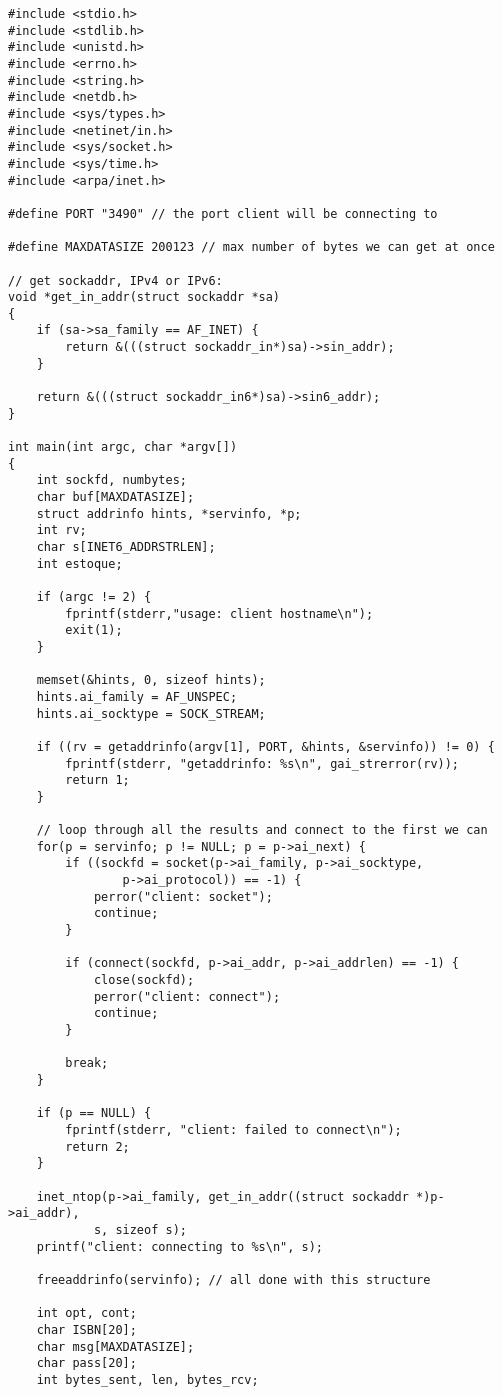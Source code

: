 \documentclass[11pt, brazil]{article} %
\begin{document}
\begin{verbatim}
#include <stdio.h>
#include <stdlib.h>
#include <unistd.h>
#include <errno.h>
#include <string.h>
#include <netdb.h>
#include <sys/types.h>
#include <netinet/in.h>
#include <sys/socket.h>
#include <sys/time.h>
#include <arpa/inet.h>

#define PORT "3490" // the port client will be connecting to 

#define MAXDATASIZE 200123 // max number of bytes we can get at once 

// get sockaddr, IPv4 or IPv6:
void *get_in_addr(struct sockaddr *sa)
{
    if (sa->sa_family == AF_INET) {
        return &(((struct sockaddr_in*)sa)->sin_addr);
    }

    return &(((struct sockaddr_in6*)sa)->sin6_addr);
}

int main(int argc, char *argv[])
{
    int sockfd, numbytes;  
    char buf[MAXDATASIZE];
    struct addrinfo hints, *servinfo, *p;
    int rv;
    char s[INET6_ADDRSTRLEN];
    int estoque;

    if (argc != 2) {
        fprintf(stderr,"usage: client hostname\n");
        exit(1);
    }

    memset(&hints, 0, sizeof hints);
    hints.ai_family = AF_UNSPEC;
    hints.ai_socktype = SOCK_STREAM;

    if ((rv = getaddrinfo(argv[1], PORT, &hints, &servinfo)) != 0) {
        fprintf(stderr, "getaddrinfo: %s\n", gai_strerror(rv));
        return 1;
    }

    // loop through all the results and connect to the first we can
    for(p = servinfo; p != NULL; p = p->ai_next) {
        if ((sockfd = socket(p->ai_family, p->ai_socktype,
                p->ai_protocol)) == -1) {
            perror("client: socket");
            continue;
        }

        if (connect(sockfd, p->ai_addr, p->ai_addrlen) == -1) {
            close(sockfd);
            perror("client: connect");
            continue;
        }

        break;
    }

    if (p == NULL) {
        fprintf(stderr, "client: failed to connect\n");
        return 2;
    }

    inet_ntop(p->ai_family, get_in_addr((struct sockaddr *)p->ai_addr),
            s, sizeof s);
    printf("client: connecting to %s\n", s);

    freeaddrinfo(servinfo); // all done with this structure
	
	int opt, cont;
	char ISBN[20];
	char msg[MAXDATASIZE];
	char pass[20];
	int bytes_sent, len, bytes_rcv;
	

\end{verbatim}
\end{document}
